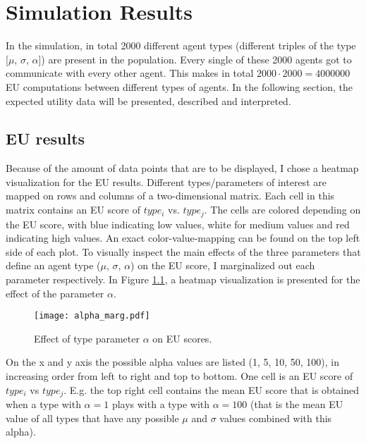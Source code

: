\chapter{Simulation Results}
\label{chapter:simulation-results}

In the simulation, in total 2000 different agent types (different triples of the type [$\mu$, $\sigma$, $\alpha$]) are present in the population. Every single of these 2000 agents got to communicate with every other agent. This makes in total $2000 \cdot 2000 = 4000000$ EU computations between different types of agents. In the following section, the expected utility data will be presented, described and interpreted.

\section{EU results}
\label{sec:eu-results}
Because of the amount of data points that are to be displayed, I chose a heatmap visualization for the EU results. Different types/parameters of interest are mapped on rows and columns of a two-dimensional matrix. Each cell in this matrix contains an EU score of $type_i$ vs. $type_j$.
The cells are colored depending on the EU score, with blue indicating low values, white for medium values and red indicating high values. An exact color-value-mapping can be found on the top left side of each plot.
To visually inspect the main effects of the three parameters that define an agent type ($\mu$, $\sigma$, $\alpha$) on the EU score, I marginalized out each parameter respectively. In Figure \ref{figure:alpha_marg}, a heatmap visualization is presented for the effect of the parameter $\alpha$.
\begin{figure}[h]
 \centering
 \texttt{[image: alpha\_marg.pdf]}
 \caption{Effect of type parameter $\alpha$ on EU scores.}
 \label{figure:alpha_marg}
\end{figure}
On the x and y axis the possible alpha values are listed (1, 5, 10, 50, 100), in increasing order from left to right and top to bottom. One cell is an EU score of $type_i$ vs $type_j$. E.g. the top right cell contains the mean EU score that is obtained when a type with $\alpha=1$ plays with a type with $\alpha=100$ (that is the mean EU value of all types that have any possible $\mu$ and $\sigma$ values combined with this alpha).\\

